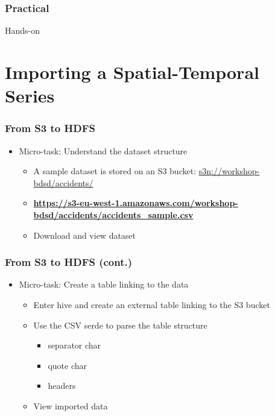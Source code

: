 \documentclass[hyperref={pdfpagelabels=true}]{beamer}
\begin{document}

\begin{frame}
\frametitle{Practical}
  \huge{Hands-on}
\end{frame}


\section{Importing a Spatial-Temporal Series} 

\begin{frame}
\frametitle{From S3 to HDFS}
\begin{itemize}
  \item<1->Micro-task: Understand the dataset structure
  \begin{itemize}
    \item<1->A sample dataset is stored on an S3 bucket: \url{s3n://workshop-bdsd/accidents/}
    \item<2->\textbf{\url{https://s3-eu-west-1.amazonaws.com/workshop-bdsd/accidents/accidents\_sample.csv}}
    \item<3->Download and view dataset
  \end{itemize}
\end{itemize}
\end{frame}

\begin{frame}
\frametitle{From S3 to HDFS (cont.)}
\begin{itemize}
  \item<1->Micro-task: Create a table linking to the data
  \begin{itemize}
    \item<1->Enter hive and create an external table linking to the S3 bucket
    \item<2->Use the CSV serde to parse the table structure
      \begin{itemize}
	\item<3->separator char
	\item<3->quote char
	\item<3->headers
       \end{itemize}
    \item<4->View imported data       
  \end{itemize}
\end{itemize}
\end{frame}
\end{document}
